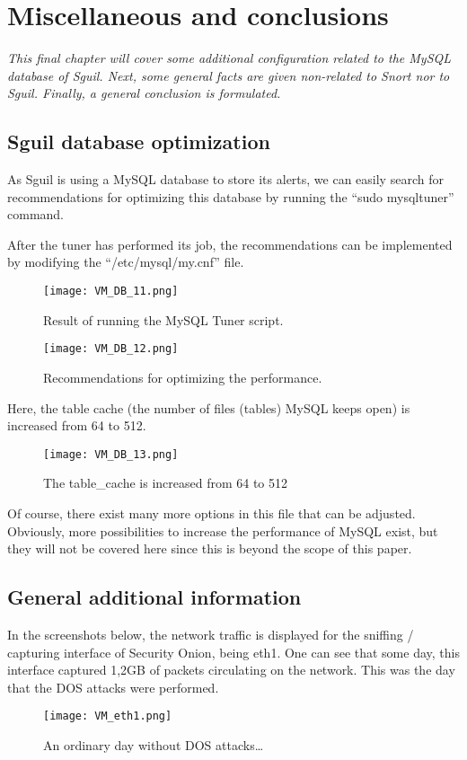 \chapter{Miscellaneous and conclusions}
\minitoc
\emph{This final chapter will cover some additional configuration related to the MySQL database of Sguil. Next, some general facts are given non-related to Snort nor to Sguil. Finally, a general conclusion is formulated.}

\section{Sguil database optimization}

As Sguil is using a MySQL database to store its alerts, we can easily search for recommendations for optimizing this database by running the ``sudo mysqltuner'' command.

After the tuner has performed its job, the recommendations can be implemented by modifying the ``/etc/mysql/my.cnf'' file.

\begin{figure}[h]
    \centering
    \texttt{[image: VM\_DB\_11.png]}
    \caption{Result of running the MySQL Tuner script.}
\end{figure}
\clearpage
\begin{figure}[h]
    \centering
    \texttt{[image: VM\_DB\_12.png]}
    \caption{Recommendations for optimizing the performance.}
\end{figure}
Here, the table cache (the number of files (tables) MySQL keeps open) is increased from 64 to 512.
\begin{figure}[h]
    \centering
    \texttt{[image: VM\_DB\_13.png]}
    \caption{The table\_cache is increased from 64 to 512}
\end{figure}
Of course, there exist many more options in this file that can be adjusted. Obviously, more possibilities to increase the performance of MySQL exist, but they will not be covered here since this is beyond the scope of this paper.
\clearpage

\section{General additional information}

In the screenshots below, the network traffic is displayed for the sniffing / capturing interface of Security Onion, being eth1. One can see that some day, this interface captured 1,2GB of packets circulating on the network. This was the day that the DOS attacks were performed.
\begin{figure}[h]
    \centering
    \texttt{[image: VM\_eth1.png]}
    \caption{An ordinary day without DOS attacks\ldots}
\end{figure}

